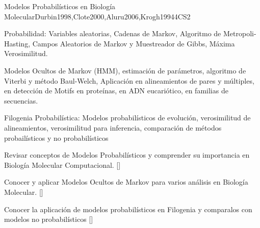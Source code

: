 \begin{syllabus}
\begin{unit}{Modelos Probabilísticos en Biología Molecular}{}{Durbin1998,Clote2000,Aluru2006,Krogh1994}{4}{CS2}
   \begin{topics}
    \item Probabilidad: Variables aleatorias, Cadenas de Markov, Algoritmo de Metropoli-Hasting, Campos Aleatorios de Markov y Muestreador de Gibbs, Máxima Verosimilitud.
    \item Modelos Ocultos de Markov (HMM), estimación de parámetros, algoritmo de Viterbi y método Baul-Welch, Aplicación en alineamientos de pares y múltiples, en detección de Motifs en proteínas, en ADN eucariótico, en familias de secuencias.
		\item Filogenia Probabilística: Modelos probabilísticos de evolución, verosimilitud de alineamientos, verosimilitud para inferencia, comparación de métodos probailísticos y no probabilísticos
   \end{topics}
   \begin{learningoutcomes}
      \item  Revisar conceptos de Modelos Probabilísticos y comprender su importancia en Biología Molecular Computacional. [\Assessment]
	  \item Conocer y aplicar Modelos Ocultos de Markov para varios análisis en Biología Molecular. [\Usage]
		\item Conocer la aplicación de modelos probabilísticos en Filogenia y comparalos con modelos no probabilísticos [\Assessment]
   \end{learningoutcomes}
\end{unit}

\begin{coursebibliography}
\end{coursebibliography}

\end{syllabus}

